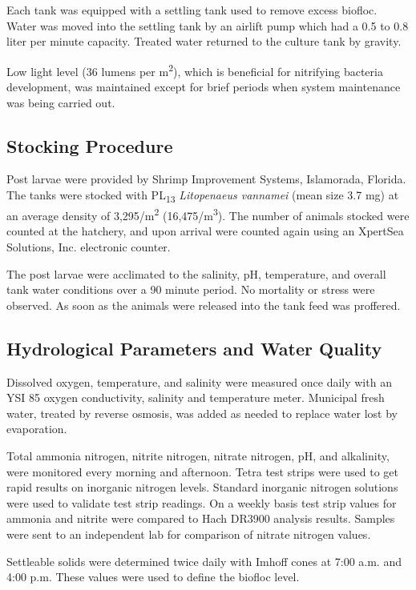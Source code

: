\documentclass[useAMS,usenatbib]{tellus}
\begin{document}
Each tank was equipped with a settling tank used to remove excess biofloc. Water was moved into the settling tank by an airlift pump which had a 0.5 to 0.8 liter per minute capacity. Treated water returned to the culture tank by gravity.

Low light level (36 lumens per m\textsuperscript{2}), which is beneficial for nitrifying bacteria development, was maintained except for brief periods when system maintenance was being carried out.

\subsection{Stocking Procedure}
\noindent Post larvae were provided by Shrimp Improvement Systems, Islamorada, Florida. The tanks were stocked with PL\textsubscript{13} \textit{Litopenaeus vannamei} (mean size 3.7 mg) at an average density of 3,295/m\textsuperscript{2} (16,475/m\textsuperscript{3}). The number of animals stocked were counted at the hatchery, and upon arrival were counted again using an XpertSea Solutions, Inc. electronic counter. 

The post larvae were acclimated to the salinity, pH, temperature, and overall tank water conditions over a 90 minute period.  No mortality or stress were observed. As soon as the animals were released into the tank feed was proffered.

\subsection{Hydrological Parameters and Water Quality}
\noindent Dissolved oxygen, temperature, and salinity were measured once daily with an YSI 85 oxygen conductivity, salinity and temperature meter. Municipal fresh water, treated by reverse osmosis, was added as needed to replace water lost by evaporation. 

Total ammonia nitrogen, nitrite nitrogen, nitrate nitrogen, pH, and alkalinity, were monitored every morning and afternoon. Tetra test strips were used to get rapid results on inorganic nitrogen levels. Standard inorganic nitrogen solutions were used to validate test strip readings. On a weekly basis test strip values for ammonia and nitrite were compared to Hach DR3900 analysis results.  Samples were sent to an independent lab for comparison of nitrate nitrogen values.

Settleable solids were determined twice daily with Imhoff cones at 7:00 a.m. and 4:00 p.m. These values were used to define the biofloc level.
\end{document}
